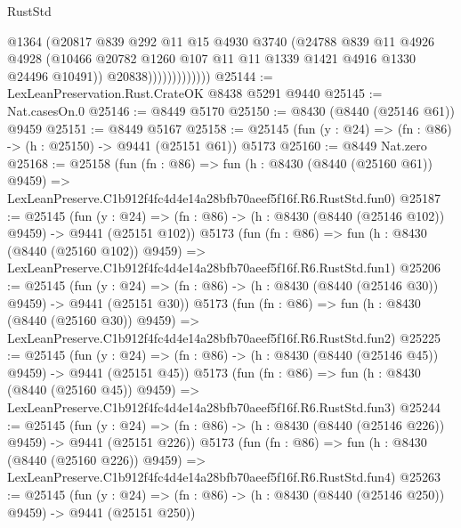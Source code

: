 \begin{lexlean}{RustStd}
\begin{coremodule}
                            @1364
                            (@20817
                              @839
                              @292
                              @11
                              @15
                              @4930
                              @3740
                              (@24788
                                @839
                                @11
                                @4926
                                @4928
                                (@10466
                                  @20782
                                  @1260
                                  @107
                                  @11
                                  @11
                                  @1339
                                  @1421
                                  @4916
                                  @1330
                                  @24496
                                  @10491))
                              @20838)))))))))))))
@25144 := LexLeanPreservation.Rust.CrateOK @8438 @5291 @9440
@25145 := Nat.casesOn.{0}
@25146 := @8449 @5170
@25150 := @8430 (@8440 (@25146 @61)) @9459
@25151 := @8449 @5167
@25158 := @25145 (fun (y : @24) => (fn : @86) -> (h : @25150) -> @9441 (@25151 @61)) @5173
@25160 := @8449 Nat.zero
@25168 := @25158
    (fun (fn : @86) =>
    fun (h : @8430 (@8440 (@25160 @61)) @9459) =>
    LexLeanPreserve.C1b912f4fc4d4e14a28bfb70aeef5f16f.R6.RustStd.fun0)
@25187 := @25145
    (fun (y : @24) => (fn : @86) -> (h : @8430 (@8440 (@25146 @102)) @9459) -> @9441 (@25151 @102))
    @5173
    (fun (fn : @86) =>
    fun (h : @8430 (@8440 (@25160 @102)) @9459) =>
    LexLeanPreserve.C1b912f4fc4d4e14a28bfb70aeef5f16f.R6.RustStd.fun1)
@25206 := @25145
    (fun (y : @24) => (fn : @86) -> (h : @8430 (@8440 (@25146 @30)) @9459) -> @9441 (@25151 @30))
    @5173
    (fun (fn : @86) =>
    fun (h : @8430 (@8440 (@25160 @30)) @9459) =>
    LexLeanPreserve.C1b912f4fc4d4e14a28bfb70aeef5f16f.R6.RustStd.fun2)
@25225 := @25145
    (fun (y : @24) => (fn : @86) -> (h : @8430 (@8440 (@25146 @45)) @9459) -> @9441 (@25151 @45))
    @5173
    (fun (fn : @86) =>
    fun (h : @8430 (@8440 (@25160 @45)) @9459) =>
    LexLeanPreserve.C1b912f4fc4d4e14a28bfb70aeef5f16f.R6.RustStd.fun3)
@25244 := @25145
    (fun (y : @24) => (fn : @86) -> (h : @8430 (@8440 (@25146 @226)) @9459) -> @9441 (@25151 @226))
    @5173
    (fun (fn : @86) =>
    fun (h : @8430 (@8440 (@25160 @226)) @9459) =>
    LexLeanPreserve.C1b912f4fc4d4e14a28bfb70aeef5f16f.R6.RustStd.fun4)
@25263 := @25145
    (fun (y : @24) => (fn : @86) -> (h : @8430 (@8440 (@25146 @250)) @9459) -> @9441 (@25151 @250))

\end{coremodule}
\end{lexlean}
